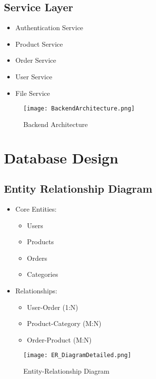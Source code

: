 \subsection{Service Layer}
\begin{itemize}
    \item Authentication Service
    \item Product Service
    \item Order Service
    \item User Service
    \item File Service
\end{itemize}

\begin{figure}[h]
    \centering
    \texttt{[image: BackendArchitecture.png]}
    \caption{Backend Architecture}
    \label{fig:backend-architecture}
\end{figure}

\section{Database Design}
\subsection{Entity Relationship Diagram}
\begin{itemize}
    \item Core Entities:
    \begin{itemize}
        \item Users
        \item Products
        \item Orders
        \item Categories
    \end{itemize}
    \item Relationships:
    \begin{itemize}
        \item User-Order (1:N)
        \item Product-Category (M:N)
        \item Order-Product (M:N)
    \end{itemize}
\end{itemize}

\begin{figure}[h]
    \centering
    \texttt{[image: ER\_DiagramDetailed.png]}
    \caption{Entity-Relationship Diagram}
    \label{fig:er-diagram}
\end{figure}

